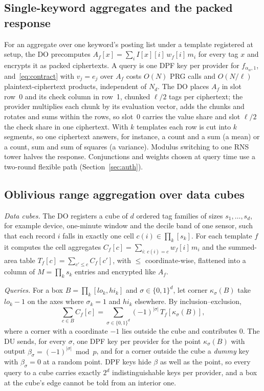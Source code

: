 \subsection{Single-keyword aggregates and the packed response}
\label{sec:fast}
For an aggregate over one keyword's posting list under a template registered
at setup, the DO precomputes $A_f[x]=\sum_i I[x][i]\,w_f[i]\,m_i$ for every
tag $x$ and encrypts it as packed ciphertexts. A query is one DPF key per
provider for $f_{\alpha_w,1}$, and~\eqref{eq:contract} with $v_j=e_j$ over
$A_f$ costs $O(N)$ PRG calls and $O(N/\ell)$ plaintext-ciphertext products,
independent of $N_d$. The DO places $A_f$ in slot row~0 and its check column
in row~1, chunked $\ell/2$ tags per ciphertext; the provider multiplies each
chunk by its evaluation vector, adds the chunks and rotates and sums within
the rows, so slot~0 carries the value share and slot $\ell/2$ the check share
in one ciphertext. With $k$ templates each row is cut into $k$ segments, so
one ciphertext answers, for instance, a count and a sum (a mean) or a count,
sum and sum of squares (a variance). Modulus switching to one RNS tower halves
the response. Conjunctions and weights chosen at query time use a two-round
flexible path (Section~\ref{sec:auth}).

\subsection{Oblivious range aggregation over data cubes}
\label{sec:range}
\emph{Data cubes.} The DO registers a cube of $d$ ordered tag families of sizes
$s_1,\dots,s_d$, for example device, one-minute window and the decile band of
one sensor, such that each record $i$ falls in exactly one cell
$c(i)\in\prod_k[s_k]$. For each template $f$ it computes the cell aggregates
$C_f[c]=\sum_{i:\,c(i)=c}w_f[i]\,m_i$ and the summed-area table
$T_f[c]=\sum_{c'\le c}C_f[c']$, with $\le$ coordinate-wise, flattened into a
column of $M=\prod_ks_k$ entries and encrypted like $A_f$.

\emph{Queries.} For a box $B=\prod_k[\mathit{lo}_k,\mathit{hi}_k]$ and
$\sigma\in\{0,1\}^d$, let corner $\kappa_\sigma(B)$ take $\mathit{lo}_k-1$ on
the axes where $\sigma_k=1$ and $\mathit{hi}_k$ elsewhere. By
inclusion--exclusion,
\begin{equation}
\label{eq:ie}
\sum_{c\in B}C_f[c]=\sum_{\sigma\in\{0,1\}^d}(-1)^{|\sigma|}\,T_f[\kappa_\sigma(B)],
\end{equation}
where a corner with a coordinate $-1$ lies outside the cube and contributes
$0$. The DU sends, for every $\sigma$, one DPF key per provider for the point
$\kappa_\sigma(B)$ with output $\beta_\sigma=(-1)^{|\sigma|}\bmod p$, and for a
corner outside the cube a \emph{dummy} key with $\beta_\sigma=0$ at a random
point. DPF keys hide $\beta$ as well as the point, so every query to a cube
carries exactly $2^d$ indistinguishable keys per provider, and a box at the
cube's edge cannot be told from an interior one.

